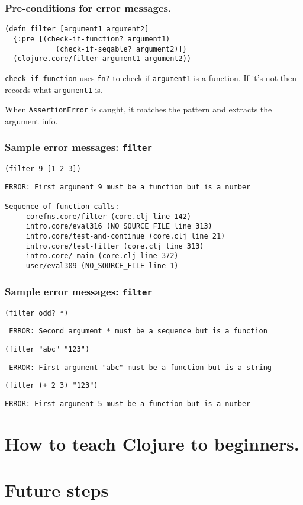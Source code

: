 \documentclass{beamer}
\begin{document}
\begin{frame}[fragile]
  \frametitle{Pre-conditions for error messages.}
\begin{verbatim}
(defn filter [argument1 argument2]
  {:pre [(check-if-function? argument1) 
            (check-if-seqable? argument2)]}
  (clojure.core/filter argument1 argument2))
\end{verbatim}
{\tt check-if-function} uses {\tt fn?} to check if {\tt argument1} is a function. 
If it's not then records what {\tt argument1} is. 

When {\tt AssertionError} is caught, it matches the pattern and extracts the argument info. 
\end{frame}

\begin{frame}[fragile]
  \frametitle{Sample error messages: {\tt filter}}
{\tt (filter 9 [1 2 3])}

\begin{verbatim}
ERROR: First argument 9 must be a function but is a number

Sequence of function calls:
     corefns.core/filter (core.clj line 142)
     intro.core/eval316 (NO_SOURCE_FILE line 313)
     intro.core/test-and-continue (core.clj line 21)
     intro.core/test-filter (core.clj line 313)
     intro.core/-main (core.clj line 372)
     user/eval309 (NO_SOURCE_FILE line 1)
\end{verbatim}
\end{frame}

\begin{frame}[fragile]
  \frametitle{Sample error messages: {\tt filter}}
{\tt (filter odd? *)}

{\tt 
ERROR: Second argument * must be a sequence but is a function
}

{\tt (filter "abc" "123")}

{\tt 
ERROR: First argument "abc" must be a function but is a string}

{\tt (filter (+ 2 3) "123")}

{\tt ERROR: First argument 5 must be a function but is a number}

\end{frame}

\section{How to teach Clojure to beginners.}


\section{Future steps}
\end{document}
